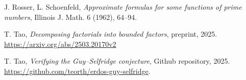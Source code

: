\documentclass[12pt,a4paper,reqno]{amsart}
\numberwithin{equation}{section}
\theoremstyle{plain}
\theoremstyle{definition}
\begin{document}
\begin{thebibliography}{10}

J. Rosser, L. Schoenfeld, \emph{Approximate formulas for some functions of prime numbers}, Illinois J. Math. 6 (1962), 64--94.

T. Tao, \emph{Decomposing factorials into bounded factors}, preprint, 2025. \url{https://arxiv.org/abs/2503.20170v2}

T. Tao, \emph{Verifying the Guy--Selfridge conjecture}, Github repository, 2025.  \url{https://github.com/teorth/erdos-guy-selfridge}.

\end{thebibliography}
\end{document}
